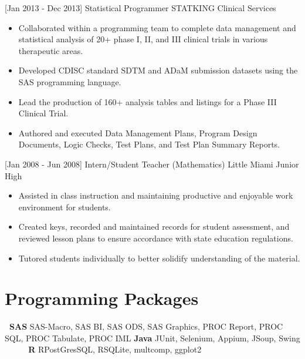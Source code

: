 \documentclass[]{moak-resume}
\begin{document}
\begin{entrylist}
    \entry
    {[Jan 2013 - Dec 2013]}
    {Statistical Programmer}
    {STATKING Clinical Services}
    {}
  \end{entrylist}
\begin{itemize}
  \setlength\itemsep{-0.4em}
  \item \small\bodyfont Collaborated within a programming team to complete data management and statistical analysis of 20+ phase I, II, and III clinical trials in various therapeutic areas.
  \item \small\bodyfont Developed CDISC standard SDTM and ADaM submission datasets using the SAS programming language.
  \item \small\bodyfont Lead the production of 160+ analysis tables and listings for a Phase III Clinical Trial.
  \item \small\bodyfont Authored and executed Data Management Plans, Program Design Documents, Logic Checks, Test Plans, and Test Plan Summary Reports.
  \newline
\end{itemize}  

\begin{entrylist}
    \entry
    {[Jan 2008 - Jun 2008]}
    {Intern/Student Teacher (Mathematics)}
    {Little Miami Junior High}
    {}
\end{entrylist}
\begin{itemize}
  \setlength\itemsep{-0.4em}
  \item \small\bodyfont Assisted in class instruction and maintaining productive and enjoyable work environment for students.
  \item \small\bodyfont Created keys, recorded and maintained records for student assessment, and reviewed lesson plans to ensure accordance with state education regulations.
  \item \small\bodyfont Tutored students individually to better solidify understanding of the material.
  \newline
\end{itemize}  


 \section{Programming Packages}
 \begin{entrylist}
 	\entry
 	 {\textbf{ SAS}}
 	 {\textnormal{SAS-Macro, SAS BI, SAS ODS, SAS Graphics, PROC Report, PROC SQL, PROC Tabulate, PROC IML}}
 	 {}
 	 {}
 	\entry
 	 {\textbf{Java}}
 	 {\textnormal{JUnit, Selenium, Appium, JSoup, Swing}}
 	 {}
 	 {}
 	\entry
 	 {\textbf{     R}}
 	 {\textnormal{RPostGresSQL, RSQLite, multcomp, ggplot2}}
 	 {}
 	 {}
 \end{entrylist}
\end{document}
